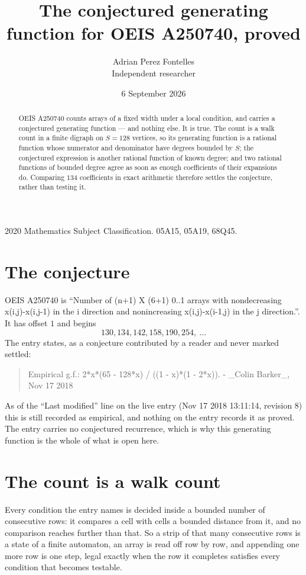 \documentclass[11pt,a4paper]{article}
\title{The conjectured generating function for OEIS A250740, proved}
\author{Adrian Perez Fontelles\\ \small Independent researcher}
\date{6 September 2026}
\theoremstyle{plain}
\theoremstyle{definition}
\begin{document}
\maketitle

\begin{abstract}
OEIS A250740 counts arrays of a fixed width under a local condition, and carries a conjectured
generating function --- and nothing else. It is true. The count is a walk count in a finite
digraph on $S=128$ vertices, so its generating function is a rational function whose numerator
and denominator have degrees bounded by $S$; the conjectured expression is another rational
function of known degree; and two rational functions of bounded degree agree as soon as enough
coefficients of their expansions do. Comparing $134$ coefficients in exact arithmetic
therefore settles the conjecture, rather than testing it.
\end{abstract}

\noindent\small 2020 Mathematics Subject Classification. 05A15, 05A19, 68Q45.\normalsize

\section{The conjecture}

OEIS A250740 is ``Number of (n+1) X (6+1) 0..1 arrays with nondecreasing x(i,j)-x(i,j-1) in the i direction and nonincreasing x(i,j)-x(i-1,j) in the j direction.''. It has offset $1$ and begins
\[
130, 134, 142, 158, 190, 254,\ \dots
\]
The entry states, as a conjecture contributed by a reader and never marked settled:
\begin{quote}
Empirical g.f.: 2*x*(65 - 128*x) / ((1 - x)*(1 - 2*x)). - \_Colin Barker\_, Nov 17 2018
\end{quote}
As of the ``Last modified'' line on the live entry (Nov 17 2018 13:11:14, revision 8) this is still
recorded as empirical, and nothing on the entry records it as proved. The entry carries no
conjectured recurrence, which is why this generating function is the whole of what is open
here.

\section{The count is a walk count}

Every condition the entry names is decided inside a bounded number of consecutive rows: it
compares a cell with cells a bounded distance from it, and no comparison reaches further than
that. So a strip of that many consecutive rows is a state of a finite automaton, an array is
read off row by row, and appending one more row is one step, legal exactly when the row it
completes satisfies every condition that becomes testable.
\end{document}
